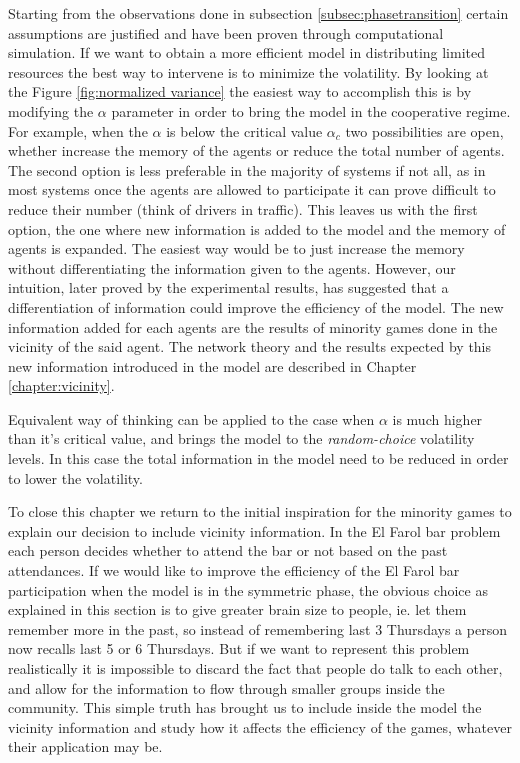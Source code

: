 Starting from the observations done in subsection \ref{subsec:phasetransition} certain assumptions are justified and have been proven through computational simulation.
If we want to obtain a more efficient model in distributing limited resources the best way to intervene is to minimize the volatility.
By looking at the Figure \ref{fig:normalized variance} the easiest way to accomplish this is by modifying the $\alpha$ parameter in order to bring the model in the cooperative regime.
For example, when the $\alpha$ is below the critical value $\alpha_c$ two possibilities are open, whether increase the memory of the agents or reduce the total number of agents.
The second option is less preferable in the majority of systems if not all, as in most systems once the agents are allowed to participate it can prove difficult to reduce their number (think of drivers in traffic).
This leaves us with the first option, the one where new information is added to the model and the memory of agents is expanded.
The easiest way would be to just increase the memory without differentiating the information given to the agents.
However, our intuition, later proved by the experimental results, has suggested that a differentiation of information could improve the efficiency of the model.
The new information added for each agents are the results of minority games done in the vicinity of the said agent.
The network theory and the results expected by this new information introduced in the model are described in Chapter \ref{chapter:vicinity}.


Equivalent way of thinking can be applied to the case when $\alpha$ is much higher than it's critical value, and brings the model to the \textit{random-choice} volatility levels.
In this case the total information in the model need to be reduced in order to lower the volatility.

To close this chapter we return to the initial inspiration for the minority games to explain our decision to include vicinity information.
In the El Farol bar problem each person decides whether to attend the bar or not based on the past attendances.
If we would like to improve the efficiency of the El Farol bar participation when the model is in the symmetric phase, the obvious choice as explained in this section is to give greater brain size to people, ie. let them remember more in the past, so instead of remembering last 3 Thursdays a person now recalls last 5 or 6 Thursdays.
But if we want to represent this problem realistically it is impossible to discard the fact that people do talk to each other, and allow for the information to flow through smaller groups inside the community.
This simple truth has brought us to include inside the model the vicinity information and study how it affects the efficiency of the games, whatever their application may be.